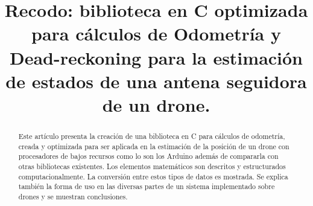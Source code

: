 \documentclass[conference]{IEEEtran}
\begin{document}
%
\title{
  Recodo: biblioteca en C optimizada para cálculos de
  Odometría y Dead-reckoning para la estimación de estados
  de una antena seguidora de un drone.
}


\author{
  \and
}



\maketitle



\begin{abstract}
Este artículo presenta la creación de una biblioteca en C para cálculos
de odometría, creada y optimizada para ser aplicada en la estimación de
la posición de un drone con procesadores de bajos recursos como lo son
los Arduino además de compararla con otras bibliotecas existentes. Los
elementos matemáticos son descritos y estructurados computacionalmente.
La conversión entre estos tipos de datos es mostrada. Se explica también
la forma de uso en las diversas partes de un sistema implementado sobre
drones y se muestran conclusiones.
\end{abstract}


%
\IEEEpeerreviewmaketitle
\end{document}
